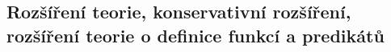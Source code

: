 \subsection{Rozšíření teorie, konservativní rozšíření, rozšíření teorie o definice funkcí a predikátů}
